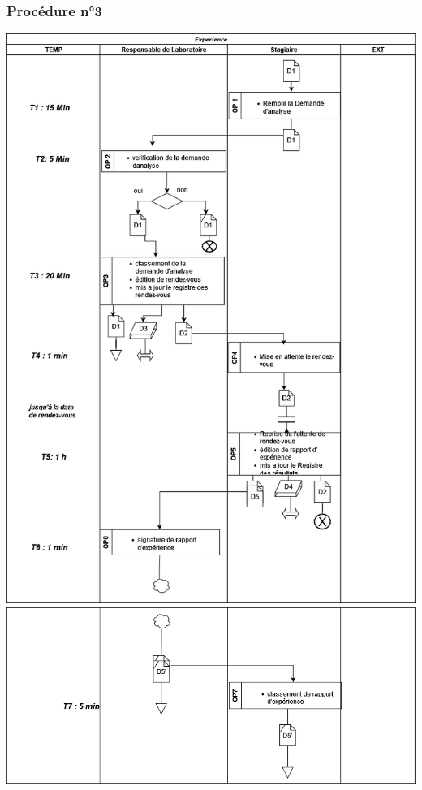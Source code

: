 \subsubsection*{Procédure n°3}
\includegraphics[width=1\textwidth]{chapter/Study of the Existing/EP/experience1.png}
\newpage
\includegraphics[width=1\textwidth]{chapter/Study of the Existing/EP/experience2.png}
